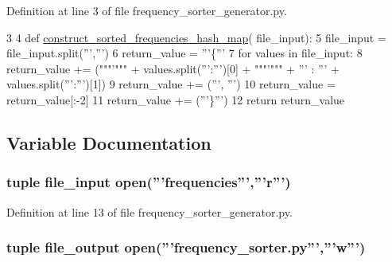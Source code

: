 Definition at line 3 of file frequency\-\_\-sorter\-\_\-generator.\-py.


\begin{DoxyCode}
3 
4 \textcolor{keyword}{def }\hyperlink{namespacefrequency__sorter__generator_a4e5d2ba44e86d8d0b09d71d55d8caecb}{construct\_sorted\_frequencies\_hash\_map}(
      file\_input):
5     file\_input = file\_input.split(\textcolor{stringliteral}{''','''})
6     return\_value = \textcolor{stringliteral}{'''\{'''}
7     \textcolor{keywordflow}{for} values \textcolor{keywordflow}{in} file\_input:
8         return\_value += (\textcolor{stringliteral}{"""'"""} + values.split(\textcolor{stringliteral}{''':'''})[0] + \textcolor{stringliteral}{"""'"""} + \textcolor{stringliteral}{''' : 
      '''} + values.split(\textcolor{stringliteral}{''':'''})[1])
9         return\_value += (\textcolor{stringliteral}{''', '''})
10     return\_value = return\_value[:-2]
11     return\_value += (\textcolor{stringliteral}{'''\}'''})
12     \textcolor{keywordflow}{return} return\_value

\end{DoxyCode}


\subsection{Variable Documentation}
\hypertarget{namespacefrequency__sorter__generator_af10bac427cf4eda50c22bfc352141c53}{
\subsubsection[{file\-\_\-input}]{\setlength{\rightskip}{0pt plus 5cm}tuple file\-\_\-input open('''frequencies''','''r''')}}\label{namespacefrequency__sorter__generator_af10bac427cf4eda50c22bfc352141c53}


Definition at line 13 of file frequency\-\_\-sorter\-\_\-generator.\-py.

\hypertarget{namespacefrequency__sorter__generator_a25e9eabadb6d4f7c84eca83f978cfd4f}{
\subsubsection[{file\-\_\-output}]{\setlength{\rightskip}{0pt plus 5cm}tuple file\-\_\-output open('''frequency\-\_\-sorter.\-py''','''w''')}}\label{namespacefrequency__sorter__generator_a25e9eabadb6d4f7c84eca83f978cfd4f}


